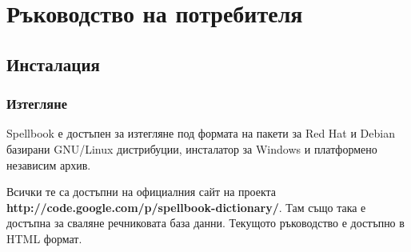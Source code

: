 \chapter{Ръководство на потребителя}
\section{Инсталация}
\subsection{Изтегляне}
Spellbook е достъпен за изтегляне под формата на пакети за Red Hat и
Debian базирани GNU/Linux дистрибуции, инсталатор за Windows и
платформено независим архив.

Всички те са достъпни на официалния сайт на проекта
\textbf{http://code.google.com/p/spellbook-dictionary/}. Там също така
е достъпна за сваляне речниковата база данни. Текущото ръководство е
достъпно в HTML формат.
